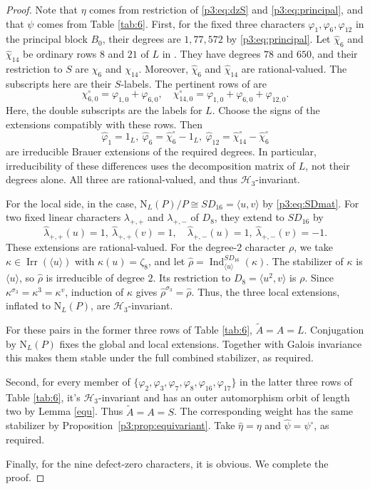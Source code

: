 \documentclass[11pt,a4paper]{article}
\numberwithin{equation}{section}
\theoremstyle{definition}
\theoremstyle{remark}
\newcommand{\Irr}{\operatorname{Irr}}
\newcommand{\HH}{\mathcal H}
\newcommand{\NN}{\mathrm N}
\newcommand{\AT}{\widetilde A}
\newcommand{\Ind}{\operatorname{Ind}}
\begin{document}
\begin{proof}
Note that $\eta$ comes from restriction of \eqref{p3:eq:dzS} and \eqref{p3:eq:principal}, and that $\psi$ comes from Table \ref{tab:6}. First, for the fixed three characters \(\varphi_1,\varphi_6,\varphi_{12}\) in the principal block $B_0$, their degrees are \(1,77,572\) by \eqref{p3:eq:principal}. Let \(\widehat\chi_6\) and \(\widehat\chi_{14}\) be ordinary rows \(8\) and \(21\) of \(L\) in \cite{OrdData}. They have degrees \(78\) and \(650\), and their restriction  to $S$ are \(\chi_6\) and \(\chi_{14}\). Moreover,  \(\widehat\chi_6\) and \(\widehat\chi_{14}\) are rational-valued. The subscripts here are their \(S\)-labels. The pertinent rows of \cite[Block. 1]{T} are
\[
 \chi_{6,0}^{\circ}=\varphi_{1,0}+\varphi_{6,0},\quad
\chi_{14,0}^{\circ}=\varphi_{1,0}+\varphi_{6,0}+\varphi_{12,0}.
\]
Here, the double subscripts are the labels for \(L\).
Choose the signs of the extensions compatibly with these rows. Then 
\[
\widehat\varphi_1=1_L,\ \widehat\varphi_6=\widehat\chi_6^{\circ}-1_L,\ 
\widehat\varphi_{12}=\widehat\chi_{14}^{\circ}-\widehat\chi_6^{\circ}
\]
are irreducible Brauer extensions of the required degrees. In particular, irreducibility of these
differences uses the decomposition matrix of $L$, not their degrees alone. All three are rational-valued, and thus
\(\HH_3\)-invariant.  

For the local side, in the case, 
\(\NN_L(P)/P\cong SD_{16}=\langle u,v\rangle\) by \eqref{p3:eq:SDmat}. For two fixed linear characters  
$\lambda_{+,+}$ and $\lambda_{+,-}$ of $D_8$, they extend to $SD_{16}$ by
\[
 \widehat\lambda_{+,+}(u)=1,\ \widehat\lambda_{+,+}(v)=1,
 \quad
 \widehat\lambda_{+,-}(u)=1,\ \widehat\lambda_{+,-}(v)=-1.
\]
These extensions are rational-valued. For the degree-$2$ character \(\rho\), we take \(\kappa\in\Irr(\langle u\rangle)\) with \(\kappa(u)=\zeta_8\), and let
 $\widehat\rho=\Ind_{\langle u\rangle}^{SD_{16}}(\kappa)$. 
The stabilizer of \(\kappa\) is \(\langle u\rangle\), so
\(\widehat\rho\) is irreducible of degree $2$. Its restriction to \(D_8=\langle u^2,v\rangle\) is \(\rho\). Since \(\kappa^{\sigma_3}=\kappa^3=\kappa^v\), induction of $\kappa$ 
gives \(\widehat\rho^{\sigma_3}=\widehat\rho\).
Thus, the three local extensions, inflated to \(\NN_L(P)\), are \(\HH_3\)-invariant.

For these pairs in the former three rows of Table \ref{tab:6}, \(\AT=A=L\). Conjugation by \(\NN_L(P)\) fixes the global and local extensions. Together with Galois invariance this makes them stable under the full combined stabilizer, as required.

Second, for every member of 
\( \{\varphi_2,\varphi_3,\varphi_7,\varphi_8,
\varphi_{16},\varphi_{17}\}\) in the latter three rows of Table \ref{tab:6}, it's \(\HH_3\)-invariant and has an
outer automorphism orbit of length two by Lemma \ref{equ}. Thus \(\AT=A=S\). The corresponding weight has the same stabilizer by Proposition~\ref{p3:prop:equivariant}.
Take \(\widehat\eta=\eta\) and \(\widehat\psi=\psi^\circ\), as required.

Finally, for the nine defect-zero characters, it is  obvious.
We complete the proof.
\end{proof}
\end{document}
